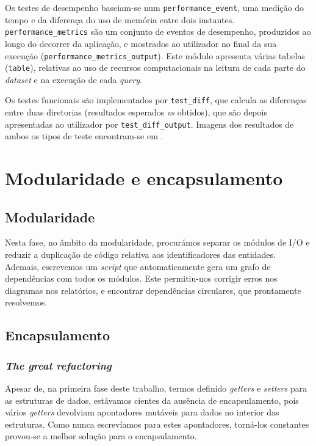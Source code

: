 \documentclass[11pt, a4paper]{article}
\begin{document}
Os testes de desempenho baseiam-se num \texttt{performance\_event}, uma medição do tempo e da
diferença do uso de memória entre dois instantes. \texttt{performance\_metrics} são um conjunto de
eventos de desempenho, produzidos ao longo do decorrer da aplicação, e mostrados ao utilizador no
final da sua execução (\texttt{performance\_metrics\_output}). Este módulo apresenta várias tabelas
(\texttt{table}), relativas ao uso de recursos computacionais na leitura de cada parte do
\emph{dataset} e na execução de cada \emph{query}.

Os testes funcionais são implementados por \texttt{test\_diff}, que calcula as diferenças entre
duas diretorias (resultados esperados \emph{vs} obtidos), que são depois apresentadas ao utilizador
por \texttt{test\_diff\_output}. Imagens dos resultados de ambos os tipos de teste encontram-se
em .

\section{Modularidade e encapsulamento}
\label{sec:modularity-and-encapsulation}

\subsection{Modularidade}
\label{sec:modularity}

Nesta fase, no âmbito da modularidade, procurámos separar os módulos de I/O e reduzir a duplicação
de código relativa aos identificadores das entidades. Ademais, escrevemos um \emph{script} que
automaticamente gera um grafo de dependências com todos os módulos. Este permitiu-nos corrigir erros
nos diagramas nos relatórios, e encontrar dependências circulares, que prontamente resolvemos.

\subsection{Encapsulamento}
\label{sec:encapsulation}

\subsubsection{\emph{The great refactoring}}
\label{sec:the-great-refactoring}

Apesar de, na primeira fase deste trabalho, termos definido \emph{getters} e \emph{setters} para as
estruturas de dados, estávamos cientes da ausência de encapsulamento, pois vários \emph{getters}
devolviam apontadores mutáveis para dados no interior das estruturas. Como nunca escrevíamos para
estes apontadores, torná-los constantes provou-se a melhor solução para o encapsulamento.
\end{document}
